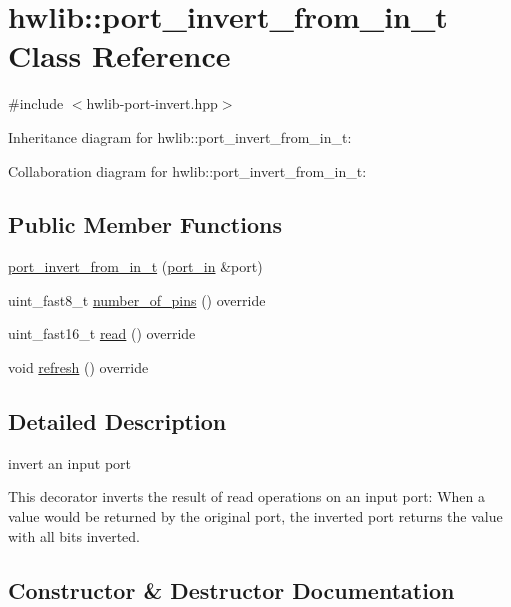 \hypertarget{classhwlib_1_1port__invert__from__in__t}{}\section{hwlib\+:\+:port\+\_\+invert\+\_\+from\+\_\+in\+\_\+t Class Reference}
\label{classhwlib_1_1port__invert__from__in__t}


{\ttfamily \#include $<$hwlib-\/port-\/invert.\+hpp$>$}



Inheritance diagram for hwlib\+:\+:port\+\_\+invert\+\_\+from\+\_\+in\+\_\+t\+:


Collaboration diagram for hwlib\+:\+:port\+\_\+invert\+\_\+from\+\_\+in\+\_\+t\+:
\subsection*{Public Member Functions}
\begin{DoxyCompactItemize}
\item 
\hyperlink{classhwlib_1_1port__invert__from__in__t_a1c8de16642771a299ff57d19e7b0358c}{port\+\_\+invert\+\_\+from\+\_\+in\+\_\+t} (\hyperlink{classhwlib_1_1port__in}{port\+\_\+in} \&port)
\item 
uint\+\_\+fast8\+\_\+t \hyperlink{classhwlib_1_1port__invert__from__in__t_ac0b3edd19cf6da6b9d0db8b246e47778}{number\+\_\+of\+\_\+pins} () override
\item 
uint\+\_\+fast16\+\_\+t \hyperlink{classhwlib_1_1port__invert__from__in__t_a757144b4b465c6d81f222698ea217f47}{read} () override
\item 
void \hyperlink{classhwlib_1_1port__invert__from__in__t_a7d1b6da3c97d9d3edbe0c10697f1ceca}{refresh} () override
\end{DoxyCompactItemize}


\subsection{Detailed Description}
invert an input port

This decorator inverts the result of read operations on an input port\+: When a value would be returned by the original port, the inverted port returns the value with all bits inverted. 

\subsection{Constructor \& Destructor Documentation}
\mbox{\label{classhwlib_1_1port__invert__from__in__t_a1c8de16642771a299ff57d19e7b0358c}} 
